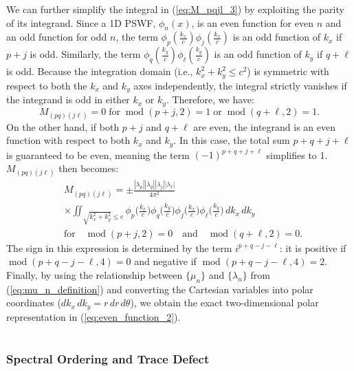 \documentclass[lettersize,journal]{IEEEtran}
\theoremstyle{plain}
\begin{document}
	
We can further simplify the integral in (\ref{eq:M_pqjl_3}) by exploiting the parity of its integrand.
Since a 1D PSWF, $\phi_n(x)$, is an even function for even $n$ and an odd function for odd $n$, the term $\phi_p(\frac{k_x}{c})\phi_j(\frac{k_x}{c})$ is an odd function of $k_x$ if $p+j$ is odd. Similarly, the term $\phi_q(\frac{k_y}{c})\phi_\ell(\frac{k_y}{c})$ is an odd function of $k_y$ if $q + \ell$ is odd. Because the integration domain (i.e., $k_x^2 + k_y^2 \leq c^2$) is symmetric with respect to both the $k_x$ and $k_y$ axes independently, the integral strictly vanishes if the integrand is odd in either $k_x$ or $k_y$. Therefore, we have:
\begin{equation}
	M_{(pq)(j\ell)} = 0 \; \text{for} \; \operatorname{mod}(p+j, 2) = 1 \; \text{or} \; \operatorname{mod}(q+\ell, 2) = 1.
	\label{eq:odd_function_2}
\end{equation}
On the other hand, if both $p+j$ and $q+\ell$ are even, the integrand is an even function with respect to both $k_x$ and $k_y$. In this case, the total sum $p+q+j+\ell$ is guaranteed to be even, meaning the term $(-1)^{p+q+j+\ell}$ simplifies to 1. $M_{(pq)(j\ell)}$ then becomes:
\begin{align}
	&M_{(pq)(j\ell)} =  \pm\frac{|\lambda_p||\lambda_q||\lambda_j||\lambda_\ell|}{4\pi^2} \nonumber \\
	& \times \iint_{\sqrt{k_x^2 + k_y^2} \leq c} \phi_p\Big(\frac{k_x}{c}\Big)\phi_q\Big(\frac{k_y}{c}\Big)\phi_j\Big(\frac{k_x}{c}\Big)\phi_\ell\Big(\frac{k_y}{c}\Big)\, dk_x \, dk_y \nonumber \\
	& \text{for} \quad \operatorname{mod}(p+j, 2) = 0 \quad \text{and} \quad \operatorname{mod}(q+\ell, 2)=0.
	\label{eq:even_function}
\end{align}
The sign in this expression is determined by the term $i^{p+q-j-\ell}$: it is positive if $\operatorname{mod}(p+q-j-\ell, 4) = 0$ and negative if $\operatorname{mod}(p+q-j-\ell, 4) = 2$. 
Finally, by using the relationship between $\{\mu_n\}$ and $\{\lambda_n\}$ from (\ref{eq:mu_n_definition}) and converting the Cartesian variables into polar coordinates ($dk_x \,dk_y = r \,dr\, d\theta$), we obtain the exact two-dimensional polar representation in (\ref{eq:even_function_2}).


\section{}
\label{appendix:truncation_error}
\subsubsection{Spectral Ordering and Trace Defect}
\end{document}
